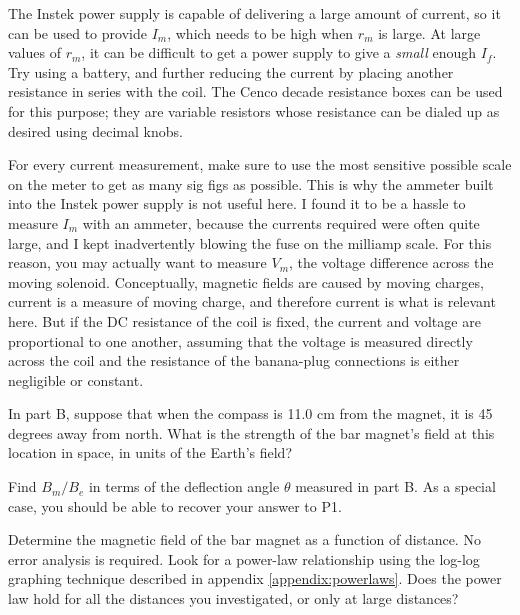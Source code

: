 The Instek power supply is capable of delivering a large amount of current, so it can
be used to provide $I_m$, which needs to be high when $r_m$ is large.
At large values of $r_m$, it can be difficult to get a power supply
to give a \emph{small} enough $I_f$. Try using a battery, and further reducing
the current by placing another resistance in series with the coil. The Cenco
decade resistance boxes can be used for this purpose; they are variable resistors
whose resistance can be dialed up as desired using decimal knobs.

For every current measurement, make sure to use the most sensitive possible scale
on the meter to get as many sig figs as possible. This is why the ammeter built into
the Instek power supply is not useful here.
I found it to be a hassle to measure $I_m$ with an ammeter, because the currents
required were often quite large, and I kept inadvertently blowing the fuse on
the milliamp scale. For this reason, you may actually want to measure $V_m$, the
voltage difference across the moving solenoid. Conceptually, magnetic fields
are caused by moving charges, current is a measure of moving charge, and therefore
current is what is relevant here. But if the DC resistance of the coil is
fixed, the current and voltage are proportional to one another, assuming that the
voltage is measured directly across the coil and the resistance of the banana-plug
connections is either negligible or constant.

\prelab

\prelabquestion  In part B, suppose that
when the compass is 11.0 cm from the magnet, it is
45 degrees away from north. What is
the strength of the bar magnet's field at this location in space,
in units of the Earth's field?

\prelabquestion Find $B_m/B_e$ in terms of the deflection angle $\theta$ measured in part B. As a special
case, you should be able to recover your answer to P1.

\analysis

Determine the magnetic
field of the bar magnet as a function of distance. No error analysis is required. 
Look for a power-law relationship using the log-log graphing technique described in 
appendix \ref{appendix:powerlaws}. Does the power law hold for
all the distances you investigated, or only at large distances?

